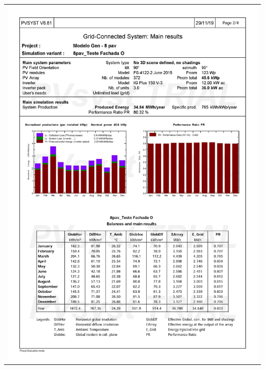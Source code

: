 \begin{table}[H]
    \centering
    \begin{tabular}{l}
        \includegraphics[width=\textwidth]{figures/attachments/resultpv8.jpg}
    \end{tabular}
\end{table}
\pagebreak
